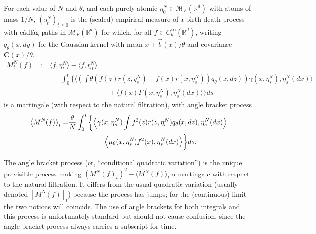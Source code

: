 \documentclass[EJP]{ejpecp} %
\newcommand{\IR}{\mathbb R}
\newcommand{\meanq}{\vec b}    %
\newcommand{\covq}{\mathbf{C}}     %
\newcommand{\measures}{\mathcal{M}_F(\IR^d)} %
\begin{document}
\begin{definition}
    \label{defn:mgale_construction}
	For each value of $N$ and $\theta$, and each purely atomic 
$\eta_0^N\in\measures$ with atoms of mass $1/N$,
$(\eta^N_t)_{t \geq 0}$ is the (scaled) empirical measure of a birth-death 
process with c\`adl\`ag paths in $\measures$ for which,
for all $f \in C^{\infty}_{b}(\IR^d)$,
writing $q_\theta(x, dy)$ for the Gaussian kernel
with mean $x + \meanq(x)/\theta$ and covariance $\covq(x) / \theta$,
\begin{equation}
    \label{eqn:eta_martingale}
\begin{aligned}
M^N_t(f)
&:=  \langle f, \eta^N_t \rangle
        -\langle f, \eta^N_0 \rangle
 \\ &\qquad {}
 -  \int_{0}^{t}\bigg\{
        \bigg\langle \left( \int \theta
             \left(
                f(z)r(z, \eta^N_{s})
                - f(x)r(x, \eta^N_{s})
            \right)
        q_\theta(x,dz) \right)
         \gamma(x, \eta^N_{s}), \eta^N_{s}(dx) \bigg\rangle
\\ & \qquad \qquad \qquad \qquad \qquad {}
    + \bigg\langle f(x) F(x, \eta^N_{s}),
    \eta^N_{s}(dx) \bigg\rangle
    \bigg\} ds
\end{aligned}    
\end{equation}
is a martingale (with respect to the natural filtration), 
with angle bracket process
    \begin{equation} \label{eqn:prelimit_martingale_variation}
\begin{aligned} \relax
\left\langle M^N(f) \right\rangle_t =& 
\frac{\theta}{N} \int_{0}^{t}\bigg\{
    \Big\langle \gamma(x, \eta^N_{s})
        \int f^2(z)r(z, \eta^N_{s}) q_\theta(x,dz) 
    , \eta^N_{s}(dx) \Big\rangle \\
& \qquad \qquad {}
    + \Big\langle \mu_\theta(x, \eta^N_{s}) f^2(x) 
    , \eta^N_{s}(dx)\Big\rangle
    \bigg\}ds. 
\end{aligned}    
\end{equation}
\end{definition}

The angle bracket process (or, ``conditional quadratic variation'')
is the unique previsible process making $(M^N(f)_t)^2 - \langle M^N(f) \rangle_t$ a martingale
with respect to the natural filtration.
It differs from the usual quadratic variation
(usually denoted $[M^N(f)]_t$)
because the process has jumps;
for the (continuous) limit the two notions will coincide.
The use of angle brackets for both integrals and this process
is unfortunately standard but should not cause confusion,
since the angle bracket process always carries a subscript for time.
\end{document}
